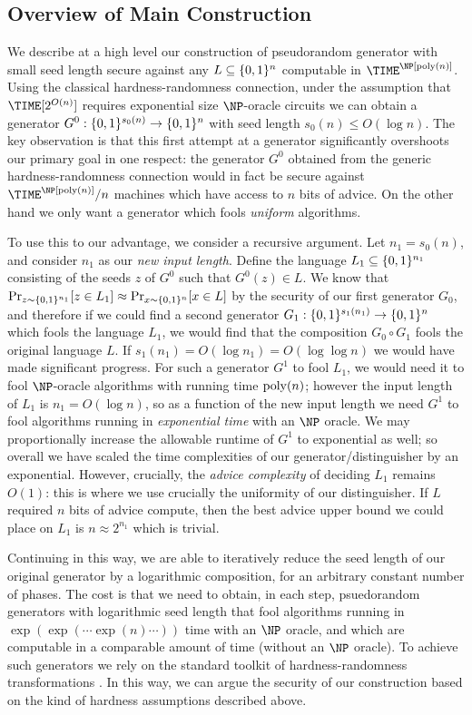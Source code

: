 \subsection{Overview of Main Construction}
We describe at a high level our construction of pseudorandom generator with small seed length secure against any $L \subseteq \{0,1\}^n$ computable in $\TIME^\NP[\poly(n)]$. Using the classical hardness-randomness connection, under the assumption that $\TIME[2^{O(n)}]$ requires exponential size $\NP$-oracle circuits we can obtain a generator $G^0: \{0,1\}^{s_0(n)} \to \{0,1\}^n$ with seed length $s_0(n) \leq O(\log n)$. The key observation is that this first attempt at a generator significantly overshoots our primary goal in one respect: the generator $G^0$ obtained from the generic hardness-randomness connection would in fact be secure against $\TIME^\NP[\poly(n)]/n$ machines which have access to $n$ bits of advice. On the other hand we only want a generator which fools \emph{uniform} algorithms. 

To use this to our advantage, we consider a recursive argument. Let $n_1 = s_0(n)$, and consider $n_1$ as our \emph{new input length}. Define the language $L_1 \subseteq \{0,1\}^{n_1}$ consisting of the seeds $z$ of $G^0$ such that $G^0(z) \in L$. We know that $\Pr_{z \sim \{0,1\}^{n_1}}[z \in L_1] \approx \Pr_{x \sim \{0,1\}^n}[x \in L]$ by the security of our first generator $G_0$, and therefore if we could find a second generator $G_1: \{0,1\}^{s_1(n_1)} \to \{0,1\}^n$ which fools the language $L_1$, we would find that the composition $G_0 \circ G_1$ fools the original language $L$. If $s_1(n_1) = O(\log  n_1) = O(\log \log n)$ we would have made significant progress. For such a generator $G^1$ to fool $L_1$, we would need it to fool $\NP$-oracle algorithms with running time $\mathrm{poly}(n)$; however the input length of $L_1$ is $n_1 = O(\log n)$, so as a function of the new input length we need $G^1$ to fool algorithms running in \emph{exponential time} with an $\NP$ oracle. We may proportionally increase the allowable runtime of $G^1$ to exponential as well; so overall we have scaled the time complexities of our generator/distinguisher by an exponential. However, crucially, the \emph{advice complexity} of deciding $L_1$ remains $O(1)$: this is where we use crucially the uniformity of our distinguisher. If $L$ required $n$ bits of advice compute, then the best advice upper bound we could place on $L_1$ is $n\approx 2^{n_1}$ which is trivial.

Continuing in this way, we are able to iteratively reduce the seed length of our original generator by a logarithmic composition, for an arbitrary constant number of phases. The cost is that we need to obtain, in each step, psuedorandom generators with logarithmic seed length that fool algorithms running in $\exp(\exp(\cdots \exp(n) \cdots ))$ time with an $\NP$ oracle, and which are computable in a comparable amount of time (without an $\NP$ oracle). To achieve such generators we rely on the standard toolkit of hardness-randomness transformations \cite{NW94,IW97,umans}. In this way, we can argue the security of our construction based on the kind of hardness assumptions described above.

